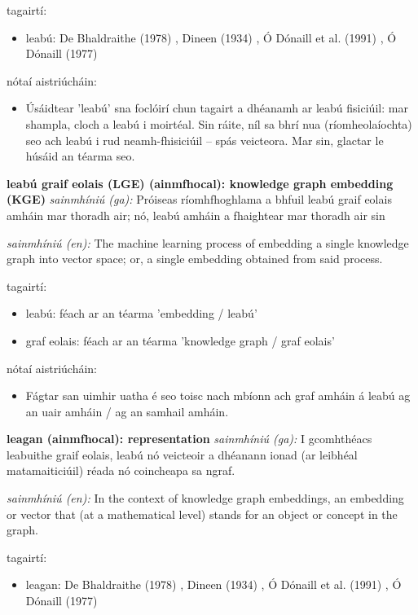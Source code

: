 \documentclass{article}
\begin{document}
tagairtí:
\begin{itemize}
	\item leabú: De Bhaldraithe (1978) \cite{de-bhaldraithe}, Dineen (1934) \cite{dineen}, Ó Dónaill et al. (1991) \cite{focloir-beag}, Ó Dónaill (1977) \cite{odonaill}
\end{itemize}

nótaí aistriúcháin:
\begin{itemize}
	\item Úsáidtear 'leabú' sna foclóirí chun tagairt a dhéanamh ar leabú fisiciúil: mar shampla, cloch a leabú i moirtéal. Sin ráite, níl sa bhrí nua (ríomheolaíochta) seo ach leabú i rud neamh-fhisiciúil -- spás veicteora. Mar sin, glactar le húsáid an téarma seo.
\end{itemize}


\textbf{leabú graif eolais (LGE) (ainmfhocal): knowledge graph embedding (KGE)}
\textit{sainmhíniú (ga):} Próiseas ríomhfhoghlama a bhfuil leabú graif eolais amháin mar thoradh air; nó, leabú amháin a fhaightear mar thoradh air sin

\textit{sainmhíniú (en):} The machine learning process of embedding a single knowledge graph into vector space; or, a single embedding obtained from said process.

tagairtí:
\begin{itemize}
	\item leabú: féach ar an téarma 'embedding / leabú'
	\item graf eolais: féach ar an téarma 'knowledge graph / graf eolais'
\end{itemize}

nótaí aistriúcháin:
\begin{itemize}
	\item Fágtar san uimhir uatha é seo toisc nach mbíonn ach graf amháin á leabú ag an uair amháin / ag an samhail amháin.
\end{itemize}


\textbf{leagan (ainmfhocal): representation}
\textit{sainmhíniú (ga):} I gcomhthéacs leabuithe graif eolais, leabú nó veicteoir a dhéanann ionad (ar leibhéal matamaiticiúil) réada nó coincheapa sa ngraf.

\textit{sainmhíniú (en):} In the context of knowledge graph embeddings, an embedding or vector that (at a mathematical level) stands for an object or concept in the graph.

tagairtí:
\begin{itemize}
	\item leagan: De Bhaldraithe (1978) \cite{de-bhaldraithe}, Dineen (1934) \cite{dineen}, Ó Dónaill et al. (1991) \cite{focloir-beag}, Ó Dónaill (1977) \cite{odonaill}
\end{itemize}
\end{document}
